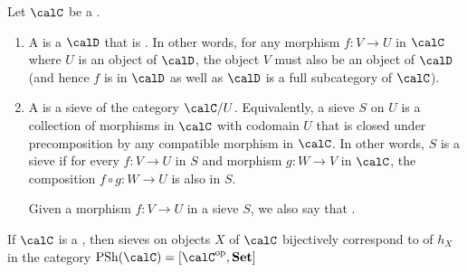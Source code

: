 \begin{definition} \label{definition:sieve_on_an_object_in_a_category}
Let $\calC$ be a . 

\begin{enumerate}
    \item A  is a  $\calD$ that is . In other words, for any morphism $f: V \to U$ in $\calC$ where $U$ is an object of $\calD$, the object $V$ must also be an object of $\calD$ (and hence $f$ is in $\calD$ as well as $\calD$ is a full subcategory of $\calC$). 
    
    \item A  is a sieve of the category $\calC/U$. Equivalently, a sieve $S$ on $U$ is a collection of morphisms in $\calC$ with codomain $U$ that is closed under precomposition by any compatible morphism in $\calC$. In other words, $S$ is a sieve if for every $f : V \to U$ in $S$ and morphism $g : W \to V$ in $\calC$, the composition $f \circ g : W \to U$ is also in $S$. 

    Given a morphism $f: V \to U$ in a sieve $S$, we also say that .
\end{enumerate}
If $\calC$ is a , then sieves on objects $X$ of $\calC$ bijectively correspond to  of $h_X$ in the category $\operatorname{PSh}(\calC) = [\calC^{\operatorname{op}}, \mathbf{Set}]$
\end{definition}
